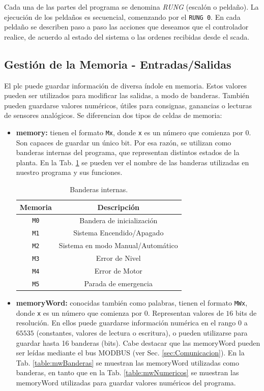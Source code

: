 Cada una de las partes del programa se denomina \emph{RUNG} (escalón o
peldaño).
La ejecución de los peldaños es secuencial, comenzando por el  \verb|RUNG 0|.
En cada peldaño se describen paso a paso las acciones que deseamos que
el controlador realice, de acuerdo al estado del sistema o las ordenes
recibidas desde el \gls{scada}.

\subsection{Gestión de la Memoria - Entradas/Salidas}

El \gls{plc} puede guardar información de diversa índole en memoria.
Estos valores pueden ser utilizados para modificar las salidas, a
modo de banderas.
También pueden guardarse valores numéricos, útiles para consignas,
ganancias o lecturas de sensores analógicos.
Se diferencian dos tipos de celdas de memoria:

\begin{itemize}
 \item \textbf{\gls{memory}:} tienen el formato \verb|Mx|, donde \verb|x| es un
número que comienza por $0$.
Son capaces de guardar un único bit.
Por esa razón, se utilizan como banderas internas del programa, que representan
distintos estados de la planta.
En la Tab. \ref{table:Banderasinternas} se pueden ver el nombre
de las banderas utilizadas en nuestro programa y sus funciones.
\begin{table}[ht]
\renewcommand{\arraystretch}{1.3}
\centering
\begin{tabular}{c||c}
\hline
\bfseries Memoria & \bfseries Descripción\\
\hline \hline
\verb|M0|  & Bandera de inicialización\\
\verb|M1|  & Sistema Encendido/Apagado\\
\verb|M2|  & Sistema en modo Manual/Automático\\
\verb|M3|  & Error de Nivel\\
\verb|M4|  & Error de Motor\\
\verb|M5|  & Parada de emergencia\\
\hline
\end{tabular}
\caption{Banderas internas.}
\label{table:Banderasinternas}
\end{table}

 \item \textbf{\gls{memoryWord}:} conocidas también como palabras, tienen el
formato \verb|MWx|, donde \verb|x| es un número que comienza por $0$.
Representan valores de $16$ bits de resolución. En ellos puede guardarse
información numérica en el rango $0$ a $65535$
(constantes, valores de lectura o escritura), o pueden utilizarse para guardar
hasta 16 banderas (bits).
Cabe destacar que las \gls{memoryWord} pueden ser leídas mediante el bus MODBUS
(ver Sec. \ref{sec:Comunicacion}).
En la Tab. \ref{table:mwBanderas} se muestran las \gls{memoryWord}
utilizadas como banderas, en tanto que en la Tab.
\ref{table:mwNumericos}
se muestran las \gls{memoryWord} utilizadas para guardar valores numéricos del
programa.
\end{itemize}


